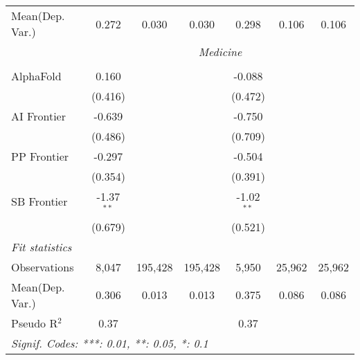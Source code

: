 \begin{tabular}{lcccccc}
Mean(Dep. Var.) & 0.272 & 0.030 & 0.030 & 0.298 & 0.106 & 0.106 \\
 & \multicolumn{6}{c}{\textit{Medicine}} \\ \\
   AlphaFold    & 0.160        &         &         & -0.088       &        &   \\   
                & (0.416)      &         &         & (0.472)      &        &   \\   
   AI Frontier  & -0.639       &         &         & -0.750       &        &   \\   
                & (0.486)      &         &         & (0.709)      &        &   \\   
   PP Frontier  & -0.297       &         &         & -0.504       &        &   \\   
                & (0.354)      &         &         & (0.391)      &        &   \\   
   SB Frontier  & -1.37$^{**}$ &         &         & -1.02$^{**}$ &        &   \\   
                & (0.679)      &         &         & (0.521)      &        &   \\   
   \midrule
   \emph{Fit statistics}\\
   Observations & 8,047        & 195,428 & 195,428 & 5,950        & 25,962 & 25,962\\  
Mean(Dep. Var.) & 0.306 & 0.013 & 0.013 & 0.375 & 0.086 & 0.086 \\
   Pseudo R$^2$ & 0.37         &         &         & 0.37         &        & \\  
   \midrule \midrule
   \multicolumn{7}{l}{\emph{Signif. Codes: ***: 0.01, **: 0.05, *: 0.1}}\\
\end{tabular}
\par\endgroup
